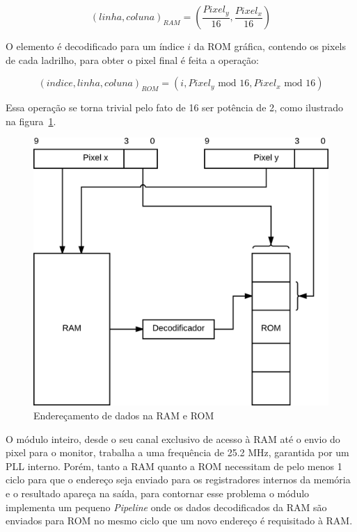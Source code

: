 \documentclass[12pt]{article}
\begin{document}
\[
(linha, coluna)_{RAM} = (\frac{Pixel_y}{16}, \frac{Pixel_x}{16})
\] 

O elemento é decodificado para um índice $i$ da ROM gráfica, contendo os pixels
de cada ladrilho, para obter o pixel final é feita a operação:

\[
(indice, linha, coluna)_{ROM} = (i, Pixel_y\text{ mod }16, Pixel_x\text{ mod }16)
\]

Essa operação se torna trivial pelo fato de 16 ser potência de 2, como 
ilustrado na figura~\ref{fig:bits}.

\begin{figure}[ht!]
	\centering
	\vspace{5mm}
	\includegraphics[scale=1]{img/bits.png}
	\vspace{3mm}
	\caption{Endereçamento de dados na RAM e ROM}
	\label{fig:bits}
\end{figure}

O módulo inteiro, desde o seu canal exclusivo de acesso à RAM até o envio
do pixel para o monitor, trabalha a uma frequência de 25.2 MHz, garantida por
um PLL interno. Porém, tanto a RAM quanto a ROM necessitam de pelo menos 1 
ciclo para que o endereço seja enviado para os registradores internos da 
memória e o resultado apareça na saída, para contornar esse problema o
módulo implementa um pequeno \emph{Pipeline} onde os dados decodificados da RAM
são enviados para ROM no mesmo ciclo que um novo endereço é requisitado à RAM.
\end{document}
